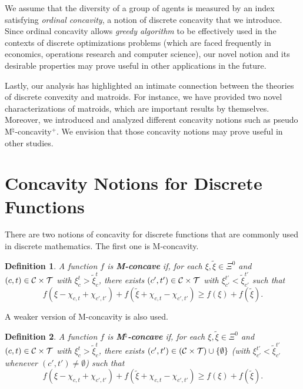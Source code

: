 \documentclass[12pt]{amsart}
\newtheorem{definition}{Definition}
\theoremstyle{remark}
\begin{document}
We assume that the diversity of a group of agents is measured by an index
satisfying \emph{ordinal concavity}, a notion of discrete concavity that we
introduce. Since ordinal concavity allows \emph{greedy algorithm} to be
effectively used in the contexts of discrete optimizations problems (which are faced
frequently in economics, operations research and computer science), our novel notion
and its desirable properties may prove useful in other applications in the future.

Lastly, our analysis has highlighted an intimate connection between the theories of
discrete convexity and matroids. For instance, we have provided two novel characterizations
of matroids, which are important results by themselves. Moreover, we introduced and analyzed
different concavity notions such as pseudo M$^\natural$-concavity$^+$.
We envision that those concavity notions may prove useful in other studies.

\appendix



\section{Concavity Notions for Discrete Functions}\label{app:compare}
There are two notions of concavity for discrete
functions that are commonly used in discrete mathematics.
The first one is M-concavity.

\begin{definition}\label{def:natural}
A function $f$ is \textbf{M-concave} if, for each $\xi,\tilde{\xi}\in \Xi^0$ and $(c,t) \in \mathcal{C} \times \mathcal{T}$ with  $\xi_c^t>\tilde{\xi}_c^t$,
there exists $(c',t') \in \mathcal{C} \times \mathcal{T}$ with  $\xi_{c'}^{t'}<\tilde{\xi}_{c'}^{t'}$ such that
\[f(\xi-\chi_{c,t}+\chi_{c',t'})+f(\tilde{\xi}+\chi_{c,t}-\chi_{c',t'})
\geq f(\xi)+f(\tilde \xi).\]
\end{definition}

A weaker version of M-concavity is also used.

\begin{definition}\label{def:natural}
A function $f$ is \textbf{M$^{\natural}$-concave} if, for each $\xi,\tilde{\xi}\in \Xi^0$ and $(c,t) \in \mathcal{C} \times \mathcal{T}$ with  $\xi_c^t>\tilde{\xi}_c^t$,
there exists $(c',t') \in (\mathcal{C} \times \mathcal{T}) \cup \{\emptyset\}$
(with $\xi_{c'}^{t'}<\tilde{\xi}_{c'}^{t'}$ whenever $(c',t')\neq \emptyset$) such that
\[f(\xi-\chi_{c,t}+\chi_{c',t'})+f(\tilde{\xi}+\chi_{c,t}-\chi_{c',t'})
\geq f(\xi)+f(\tilde \xi).\]

\end{definition}
\end{document}
